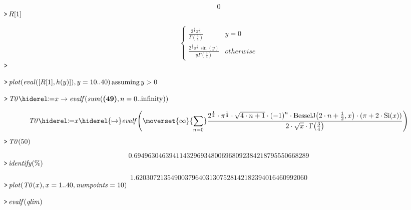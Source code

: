 \documentclass{article}
\begin{document}
\begin{dmath}\label{(52)}
0
\end{dmath}
\mapleinput
{$ \displaystyle \texttt{>\,} R [1] $}

\begin{dmath}\label{(53)}
\left\{\begin{array}{cc}
\frac{2^{\frac{1}{4}} \pi^{\frac{1}{4}}}{\Gamma \left(\frac{3}{4}\right)} & y =0 
\\
 \frac{2^{\frac{1}{4}} \pi^{\frac{1}{4}} \sin \left(y \right)}{y \Gamma \left(\frac{3}{4}\right)} & \mathit{otherwise}  
\end{array}\right.
\end{dmath}
\mapleinput
{$ \displaystyle \texttt{>\,} \, $}

\mapleinput
{$ \displaystyle \texttt{>\,} \mathit{plot} (\mathit{eval} ([R [1],h (y)]),y =10..40)\,\mathrm{assuming}\,y >0 $}


\mapleinput
{$ \displaystyle \texttt{>\,} \mathit{T0} \coloneqq x \rightarrow \mathit{evalf} (\mathit{sum} (\mapleref{(49)},n =0..\mathrm{infinity})) $}

\begin{dmath}\label{(54)}
\mathit{T0} \coloneqq x \hiderel{\mapsto }\mathit{evalf} \! \left(\moverset{\infty}{\munderset{n =0}{\sum}}\frac{2^{\frac{1}{4}}\cdot \pi^{\frac{1}{4}}\cdot \sqrt{4\cdot n +1}\cdot \left(-1\right)^{n}\cdot \mathrm{BesselJ}\! \left(2\cdot n +\frac{1}{2},x \right)\cdot \left(\pi +2\cdot \mathrm{Si}\! \left(x \right)\right)}{2\cdot \sqrt{x}\cdot \Gamma \! \left(\frac{3}{4}\right)}\right)
\end{dmath}
\mapleinput
{$ \displaystyle \texttt{>\,} \mathit{T0} (50) $}

\begin{dmath}\label{(55)}
 0.69496304639411432969348006968092384218795550668289
\end{dmath}
\mapleinput
{$ \displaystyle \texttt{>\,} \mathit{identify} (\%) $}

\begin{dmath}\label{(56)}
 1.6203072135490037964031307528142182394016460992060
\end{dmath}
\mapleinput
{$ \displaystyle \texttt{>\,} \mathit{plot} (\mathit{T0} (x),x =1..40,\mathit{numpoints} =10) $}

\mapleinput
{$ \displaystyle \texttt{>\,} \mathit{evalf} (\mathit{qlim}) $}
\end{document}
